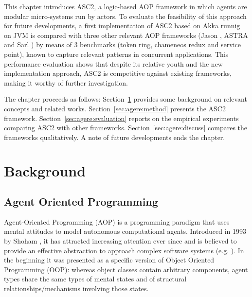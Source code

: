 

This chapter introduces ASC2, a logic-based AOP framework in which agents are modular micro-systems run by actors. To evaluate the feasibility of this approach for future developments, a first implementation of ASC2 based on Akka runnig on JVM is compared with three other relevant AOP frameworks (Jason \cite{Bordini2005}, ASTRA \cite{Astra} and Sarl \cite{Astra}) by means of 3 benchmarks (token ring, chameneos redux and service point), known to capture relevant patterns in concurrent applications. This performance evaluation shows that despite its relative youth and the new implementation approach, ASC2 is competitive against existing frameworks, making it worthy of further investigation.

The chapter proceeds as follows: Section~\ref{sec:agere:background} provides some background on relevant concepts and related works. Section~\ref{sec:agere:method} presents the ASC2 framework. Section~\ref{sec:agere:evaluation} reports on the empirical experiments comparing ASC2 with other frameworks. Section~\ref{sec:agere:discuss} compares the frameworks qualitatively. A note of future developments ends the chapter.


\section{Background}
\label{sec:agere:background}
\subsection{Agent Oriented Programming}

Agent-Oriented Programming (AOP) is a programming paradigm that uses mental attitudes to model autonomous computational agents. Introduced in 1993 by Shoham \cite{shoham1993agent}, it has attracted increasing attention ever since and is believed to provide an effective abstraction to approach complex software systems (e.g. \cite{Sarl}). In the beginning it was presented as a specific version of Object Oriented Programming (OOP): whereas object classes contain arbitrary components, agent types share the same types of mental states and of structural relationships/mechanisms involving those states. 


